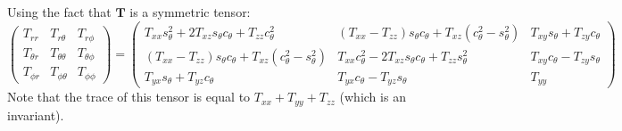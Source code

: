 \documentclass[a4paper,12pt]{article}
\begin{document}
Using 
the fact that ${\bm T}$ is a symmetric tensor:
\begin{equation}
\left(
\begin{array}{ccc}
T_{rr}       & T_{r\theta}      & T_{r\phi} \\
T_{\theta r} & T_{\theta\theta} & T_{\theta\phi} \\
T_{\phi r}   & T_{\phi \theta}  & T_{\phi\phi}
\end{array}
\right)
=
\left(
\begin{array}{ccc}
T_{xx} s^2_\theta  + 2 T_{xz}s_\theta c_\theta   + T_{zz}c^2_\theta &
(T_{xx}-T_{zz}) s_\theta c_\theta  + T_{xz} ( c^2_\theta -s^2_\theta  )   &
T_{xy} s_\theta  + T_{zy} c_\theta 
\\
(T_{xx} -T_{zz} )s_\theta c_\theta + T_{xz} (c^2_\theta - s^2_\theta )  &
T_{xx} c^2_\theta  - 2T_{xz}s_\theta c_\theta   + T_{zz}s^2_\theta & 
T_{xy} c_\theta  - T_{zy}  s_\theta 
\\ 
T_{yx} s_\theta  + T_{yz}c_\theta & T_{yx} c_\theta  - T_{yz}s_\theta  & T_{yy}
\end{array}
\right) 
\end{equation}
Note that the trace of this tensor is equal to $T_{xx}+T_{yy}+T_{zz}$ (which is an invariant).
\end{document}
